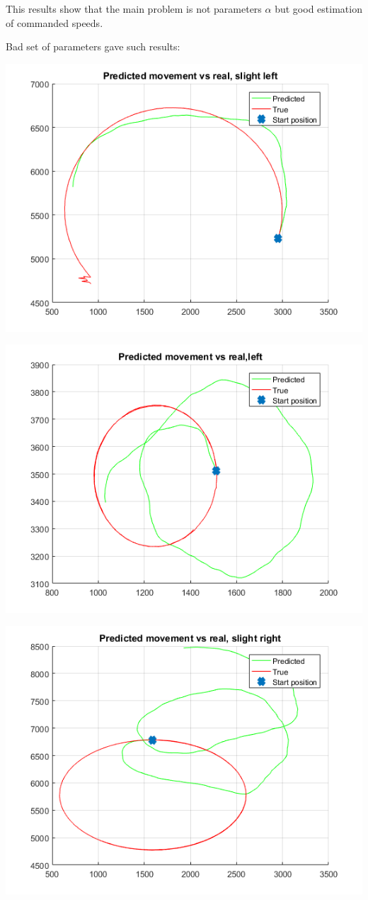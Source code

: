\documentclass[a4paper, 12pt]{article}
\begin{document}
This results show that the main problem is not parameters $\alpha$ but good estimation of commanded speeds.

Bad set of parameters gave such results:

\includegraphics[scale = 1]{bl.png}

\includegraphics[scale = 1]{bll.png}

\includegraphics[scale = 1]{br.png}
\end{document}
